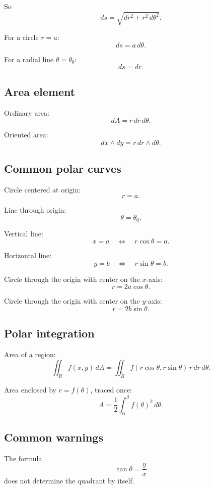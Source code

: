So
\[
\boxed{
    ds=\sqrt{dr^2+r^2\,d\theta^2}.
}
\]

For a circle \(r=a\):
\[
\boxed{
    ds=a\,d\theta.
}
\]

For a radial line \(\theta=\theta_0\):
\[
\boxed{
    ds=dr.
}
\]

\subsection*{Area element}

Ordinary area:
\[
\boxed{
    dA=r\,dr\,d\theta.
}
\]

Oriented area:
\[
\boxed{
    dx\wedge dy
    =
    r\,dr\wedge d\theta.
}
\]

\subsection*{Common polar curves}

Circle centered at origin:
\[
\boxed{
    r=a.
}
\]

Line through origin:
\[
\boxed{
    \theta=\theta_0.
}
\]

Vertical line:
\[
\boxed{
    x=a
    \quad\Longleftrightarrow\quad
    r\cos\theta=a.
}
\]

Horizontal line:
\[
\boxed{
    y=b
    \quad\Longleftrightarrow\quad
    r\sin\theta=b.
}
\]

Circle through the origin with center on the \(x\)-axis:
\[
\boxed{
    r=2a\cos\theta.
}
\]

Circle through the origin with center on the \(y\)-axis:
\[
\boxed{
    r=2b\sin\theta.
}
\]

\subsection*{Polar integration}

Area of a region:
\[
\boxed{
    \iint_R f(x,y)\,dA
    =
    \iint_{\widetilde R}
    f(r\cos\theta,r\sin\theta)\,r\,dr\,d\theta.
}
\]

Area enclosed by \(r=f(\theta)\), traced once:
\[
\boxed{
    A=\frac12\int_\alpha^\beta f(\theta)^2\,d\theta.
}
\]

\subsection*{Common warnings}

The formula
\[
    \tan\theta=\frac yx
\]
does not determine the quadrant by itself.

